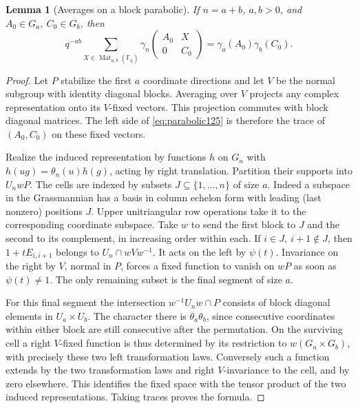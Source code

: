 \documentclass[a4paper,11pt]{article}
\newtheorem{lemma}[proposition]{Lemma}
\theoremstyle{definition}
\theoremstyle{remark}
\numberwithin{equation}{section}
\begin{document}
\begin{lemma}[Averages on a block parabolic]\label{lem:parabolic125}
If \(n=a+b\), \(a,b>0\), and \(A_0\in G_a,\ C_0\in G_b\), then
\begin{equation}
 q^{-ab}\sum_{X\in\operatorname{Mat}_{a,b}(\mathbb F_q)}
 \gamma_n\!\begin{pmatrix}A_0&X\\0&C_0\end{pmatrix}
     =\gamma_a(A_0)\gamma_b(C_0).
 \label{eq:parabolic125}
\end{equation}
\end{lemma}
\begin{proof}
Let \(P\) stabilize the first \(a\) coordinate directions and let
\(V\) be the normal subgroup with identity diagonal blocks. Averaging
over \(V\) projects any complex representation onto its \(V\)-fixed
vectors. This projection commutes with block diagonal matrices.
The left side of \eqref{eq:parabolic125} is therefore the trace
of \((A_0,C_0)\) on these fixed vectors.

Realize the induced representation by functions \(h\) on \(G_n\)
with \(h(ug)=\theta_n(u)h(g)\), acting by right translation.
Partition their supports into \(U_n w P\). The cells are indexed by
subsets \(J\subseteq\{1,\ldots,n\}\) of size \(a\). Indeed a subspace
in the Grassmannian has a basis in column echelon form with leading
(last nonzero) positions \(J\). Upper unitriangular row operations
take it to the corresponding coordinate subspace. Take \(w\) to
send the first block to \(J\) and the second to its complement,
in increasing order within each. If \(i\in J,\ i+1\notin J\),
then \(1+tE_{i,i+1}\) belongs to \(U_n\cap wVw^{-1}\).
It acts on the left by \(\psi(t)\). Invariance on the right by
\(V\), normal in \(P\), forces a fixed function to vanish on
\(wP\) as soon as \(\psi(t)\ne1\). The only remaining subset
is the final segment of size \(a\).

For this final segment the intersection \(w^{-1}U_nw\cap P\)
consists of block diagonal elements in \(U_a\times U_b\).
The character there is \(\theta_a\theta_b\), since consecutive
coordinates within either block are still consecutive after the
permutation. On the surviving cell a right \(V\)-fixed function is
thus determined by its restriction to \(w(G_a\times G_b)\), with
precisely these two left transformation laws. Conversely such a
function extends by the two transformation laws and right
\(V\)-invariance to the cell, and by zero elsewhere. This identifies
the fixed space with the tensor product of the two induced
representations. Taking traces proves the formula.
\end{proof}
\end{document}
